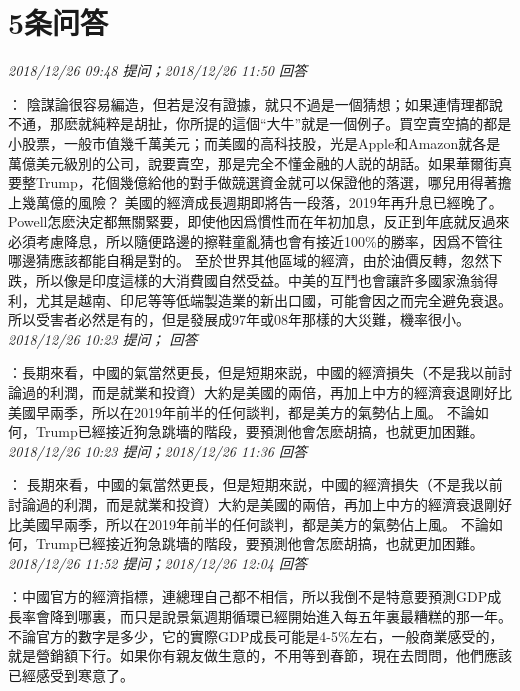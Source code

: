 \documentclass[twocolumn]{ctexart}
\begin{document}
\section{5条问答}

\textit{\hfill\noindent\small 2018/12/26 09:48 提问；2018/12/26 11:50 回答}

：
陰謀論很容易編造，但若是沒有證據，就只不過是一個猜想；如果連情理都說不通，那麽就純粹是胡扯，你所提的這個“大牛”就是一個例子。買空賣空搞的都是小股票，一般市值幾千萬美元；而美國的高科技股，光是Apple和Amazon就各是萬億美元級別的公司，說要賣空，那是完全不懂金融的人説的胡話。如果華爾街真要整Trump，花個幾億給他的對手做競選資金就可以保證他的落選，哪兒用得著擔上幾萬億的風險？ 
美國的經濟成長週期即將告一段落，2019年再升息已經晚了。 Powell怎麽決定都無關緊要，即使他因爲慣性而在年初加息，反正到年底就反過來必須考慮降息，所以隨便路邊的擦鞋童亂猜也會有接近100\%的勝率，因爲不管往哪邊猜應該都能自稱是對的。 
至於世界其他區域的經濟，由於油價反轉，忽然下跌，所以像是印度這樣的大消費國自然受益。中美的互鬥也會讓許多國家漁翁得利，尤其是越南、印尼等等低端製造業的新出口國，可能會因之而完全避免衰退。所以受害者必然是有的，但是發展成97年或08年那樣的大災難，機率很小。
\\

\textit{\hfill\noindent\small 2018/12/26 10:23 提问； 回答}

：長期來看，中國的氣當然更長，但是短期來説，中國的經濟損失（不是我以前討論過的利潤，而是就業和投資）大約是美國的兩倍，再加上中方的經濟衰退剛好比美國早兩季，所以在2019年前半的任何談判，都是美方的氣勢佔上風。 不論如何，Trump已經接近狗急跳墻的階段，要預測他會怎麽胡搞，也就更加困難。\\

\textit{\hfill\noindent\small 2018/12/26 10:23 提问；2018/12/26 11:36 回答}

：
長期來看，中國的氣當然更長，但是短期來説，中國的經濟損失（不是我以前討論過的利潤，而是就業和投資）大約是美國的兩倍，再加上中方的經濟衰退剛好比美國早兩季，所以在2019年前半的任何談判，都是美方的氣勢佔上風。 
不論如何，Trump已經接近狗急跳墻的階段，要預測他會怎麽胡搞，也就更加困難。
\\

\textit{\hfill\noindent\small 2018/12/26 11:52 提问；2018/12/26 12:04 回答}

：中國官方的經濟指標，連總理自己都不相信，所以我倒不是特意要預測GDP成長率會降到哪裏，而只是說景氣週期循環已經開始進入每五年裏最糟糕的那一年。不論官方的數字是多少，它的實際GDP成長可能是4-5\%左右，一般商業感受的，就是營銷額下行。如果你有親友做生意的，不用等到春節，現在去問問，他們應該已經感受到寒意了。
\\
\end{document}
